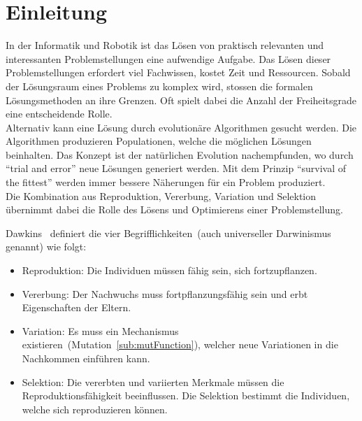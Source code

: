 %
%


\chapter{Einleitung}

  In der Informatik und Robotik ist das Lösen von praktisch relevanten und
  interessanten Problemstellungen eine aufwendige Aufgabe.
  Das Lösen dieser Problemstellungen erfordert viel Fachwissen, kostet Zeit und Ressourcen.
  Sobald der Lösungsraum eines Problems zu komplex wird, stossen die formalen Lösungsmethoden an ihre Grenzen.
  Oft spielt dabei die Anzahl der Freiheitsgrade eine entscheidende Rolle.
  \\
  Alternativ kann eine Lösung durch evolutionäre Algorithmen gesucht werden.
  Die Algorithmen produzieren Populationen, welche die möglichen Lösungen beinhalten.
  Das Konzept ist der natürlichen Evolution nachempfunden, wo durch ``trial and error'' neue Lösungen generiert werden.
  Mit dem Prinzip ``survival of the fittest'' werden immer bessere Näherungen für ein Problem produziert.
  \\
  Die Kombination aus Reproduktion, Vererbung, Variation und Selektion
  übernimmt dabei die Rolle des Lösens und Optimierens einer Problemstellung.

  \medskip

  Dawkins~\cite{book:universalDarwinism} definiert die vier Begrifflichkeiten~(auch universeller Darwinismus genannt) wie folgt:

  \begin{itemize}

    \item Reproduktion: Die Individuen müssen fähig sein, sich fortzupflanzen.

    \item Vererbung: Der Nachwuchs muss fortpflanzungsfähig sein und erbt Eigenschaften der Eltern.

    \item Variation: Es muss ein Mechanismus existieren~(Mutation~\vref{sub:mutFunction}),
      welcher neue Variationen in die Nachkommen einführen kann.

    \item Selektion: Die vererbten und variierten Merkmale müssen die Reproduktionsfähigkeit beeinflussen.
      Die Selektion bestimmt die Individuen, welche sich reproduzieren können.

  \end{itemize}

